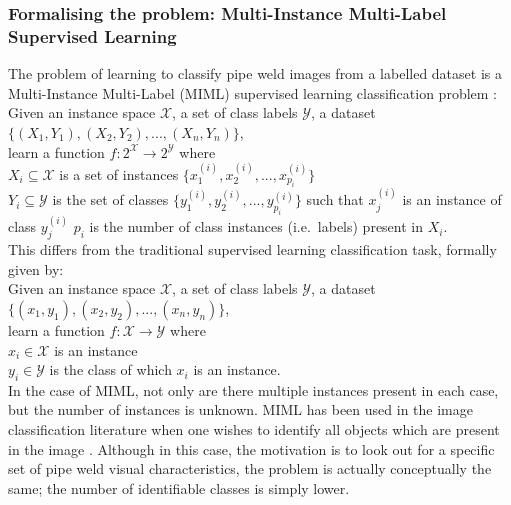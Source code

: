 \documentclass[a4paper,11pt]{article}
\begin{document}
\subsubsection{Formalising the problem: Multi-Instance Multi-Label Supervised Learning}

The problem of learning to classify pipe weld images from a labelled dataset is a Multi-Instance Multi-Label (MIML) supervised learning classification problem \cite{MIML}: \\

\indent Given an instance space $\mathcal{X}$, a set of class labels $\mathcal{Y}$, a dataset $\{(X_{1},Y_{1}),(X_{2},Y_{2}), ..., (X_{n},Y_{n})\}$,\\ 
\indent learn a function $f : 2^{\mathcal{X}} \rightarrow 2^{\mathcal{Y}}$ where\\  
\indent \indent $X_{i} \subseteq \mathcal{X}$ is a set of instances $\{x_{1}^{(i)}, x_{2}^{(i)}, ..., x_{p_{i}}^{(i)}\}$\\   
\indent \indent $Y_{	i} \subseteq \mathcal{Y}$ is the set of classes $\{y_{1}^{(i)}, y_{2}^{(i)}, ..., y_{p_{i}}^{(i)}\}$ such that $x_{j}^{(i)}$ is an instance of class $y_{j}^{(i)}$ 
\indent \indent $p_{i}$ is the number of class instances (i.e.\ labels) present in $X_{i}$.\\


This differs from the traditional supervised learning classification task, formally given by: \\ 

\indent Given an instance space $\mathcal{X}$, a set of class labels $\mathcal{Y}$, a dataset $\{(x_{1},y_{1}),(x_{2},y_{2}), ..., (x_{n},y_{n})\}$,\\ 
\indent learn a function $f : \mathcal{X} \rightarrow \mathcal{Y}$ where\\  
\indent \indent $x_{i} \in \mathcal{X}$ is an instance \\   
\indent \indent $y_{	i} \in \mathcal{Y}$ is the class of which $x_{i}$ is an instance.\\

In the case of MIML, not only are there multiple instances present in each case, but the number of instances is unknown. MIML has been used in the image classification literature when one wishes to identify all objects which are present in the image \cite{MIML}. Although in this case, the motivation is to look out for a specific set of pipe weld visual characteristics, the problem is actually conceptually the same; the number of identifiable classes is simply lower.
\end{document}
